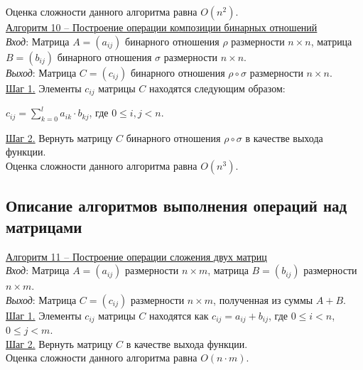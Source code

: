 \documentclass[bachelor, och, labwork]{shiza}
\begin{document}
        Оценка сложности данного алгоритма равна $O(n^2)$.\\

        \underline{Алгоритм 10 -- Построение операции композиции бинарных отношений}\\
            \textit{Вход}: Матрица $A = (a_{ij})$ бинарного отношения $\rho$ размерности $n \times n$, матрица $B = (b_{ij})$ 
            бинарного отношения $\sigma$ размерности $n \times n$.\\
            \textit{Выход}: Матрица $C = (c_{ij})$ бинарного отношения $\rho \circ \sigma$ размерности $n \times n$.\\
            \underline{Шаг 1.} Элементы $c_{ij}$ матрицы $C$ находятся следующим образом:

            \begin{center}
                $c_{ij} = \sum_{k = 0}^{l} a_{ik} \cdot b_{kj}$, где $0 \leq i,j < n$.\\
            \end{center}  
            \underline{Шаг 2.} Вернуть матрицу $C$ бинарного отношения $\rho \circ \sigma$ в качестве выхода функции.\\
            
        Оценка сложности данного алгоритма равна $O(n^3)$.\\

    \subsection{Описание алгоритмов выполнения операций над матрицами}
        
        \underline{Алгоритм 11 -- Построение операции сложения двух матриц}\\
            \textit{Вход}: Матрица $A = (a_{ij})$ размерности $n \times m$, матрица $B = (b_{ij})$ размерности $n \times m$.\\
            \textit{Выход}: Матрица $C = (c_{ij})$ размерности $n \times m$, полученная из суммы $A + B$.\\
            \underline{Шаг 1.} Элементы $c_{ij}$ матрицы $C$ находятся как $c_{ij} = a_{ij} + b_{ij}$, где
            $0 \leq i < n$, $0 \leq j < m$. \\
            \underline{Шаг 2.} Вернуть матрицу $C$ в качестве выхода функции.\\
            
            Оценка сложности данного алгоритма равна $O(n \cdot m)$.\\
\end{document}
